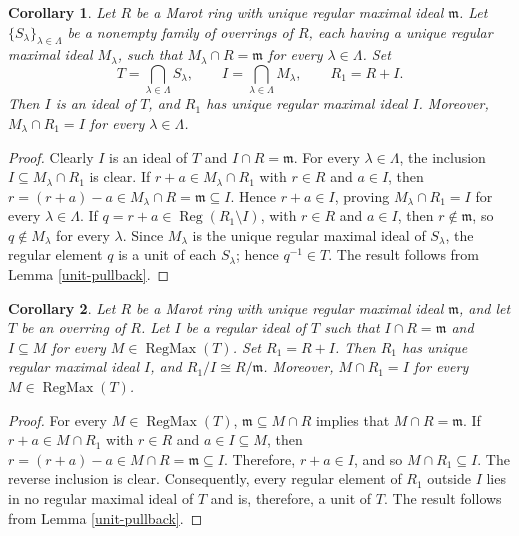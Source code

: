 \documentclass[12pt]{article}
\newtheorem{corollary}{Corollary}
\newcommand{\Reg}{\operatorname{Reg}}
\newcommand{\RegMax}{\operatorname{RegMax}}
\begin{document}
\begin{corollary}\label{two-pullback}
		Let $R$ be a Marot ring with unique regular maximal ideal $\mathfrak{m}$. Let $\{S_\lambda\}_{\lambda\in\Lambda}$ be a nonempty family of overrings of $R$, each having a unique regular maximal ideal $M_\lambda$, such that $M_\lambda\cap R=\mathfrak{m}$ for every $\lambda\in\Lambda$. Set
		\[
		T=\bigcap_{\lambda\in\Lambda}S_\lambda,\qquad
		I=\bigcap_{\lambda\in\Lambda}M_\lambda,\qquad R_1=R+I.
		\]
		Then $I$ is an ideal of $T$, and $R_1$ has unique regular maximal ideal $I$. Moreover, $M_\lambda\cap R_1=I$ for every $\lambda\in\Lambda$.
	\end{corollary}
	\begin{proof}
		Clearly $I$ is an ideal of $T$ and $I\cap R=\mathfrak{m}$. For every $\lambda\in\Lambda$, the inclusion $I\subseteq M_\lambda\cap R_1$ is clear. If $r+a\in M_\lambda\cap R_1$ with $r\in R$ and $a\in I$, then $r=(r+a)-a\in M_\lambda\cap R =\mathfrak{m}\subseteq I. $ Hence $r+a\in I$, proving $M_\lambda\cap R_1=I$ for every $\lambda\in\Lambda$. If $q=r+a\in\Reg(R_1\setminus I)$, with $r\in R$ and $a\in I$, then $r\notin\mathfrak{m}$, so $q\notin M_\lambda$ for every $\lambda$. Since $M_\lambda$ is the unique regular maximal ideal of $S_\lambda$, the regular element $q$ is a unit of each $S_\lambda$; hence $q^{-1}\in T$. The result follows from Lemma \ref{unit-pullback}.
	\end{proof}

\begin{corollary}\label{regular-pullback}
		Let $R$ be a Marot ring with unique regular maximal ideal $\mathfrak{m}$, and let $T$ be an overring of $R$. Let $I$ be a regular ideal of $T$ such that $I\cap R=\mathfrak{m}$ and $I\subseteq M$ for every $M\in\RegMax(T)$. Set $R_1=R+I$. Then $R_1$ has unique regular maximal ideal $I$, and $R_1/I\cong R/\mathfrak{m}$. Moreover, $M\cap R_1=I$ for every $M\in\RegMax(T)$.
	\end{corollary}
	\begin{proof}
		For every $M\in\RegMax(T)$, $\mathfrak{m}\subseteq M\cap R$ implies that $M\cap R=\mathfrak{m}$. If $r+a\in M\cap R_1$ with $r\in R$ and $a\in I\subseteq M$, then $r=(r+a)-a\in M\cap R=\mathfrak{m}\subseteq I$. Therefore, $r+a\in I$, and so $M\cap R_1\subseteq I$. The reverse inclusion is clear. Consequently, every regular element of $R_1$ outside $I$ lies in no regular maximal ideal of $T$ and is, therefore, a unit of $T$. The result follows from Lemma \ref{unit-pullback}.
	\end{proof}
\end{document}

